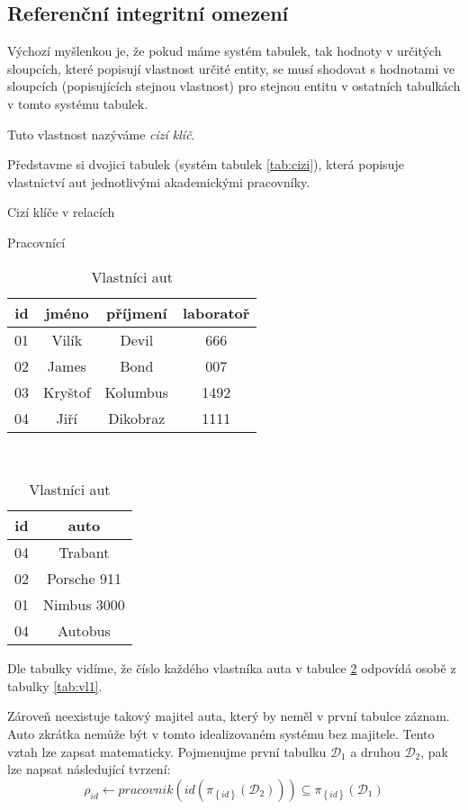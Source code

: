 \subsection{Referenční integritní omezení}
Výchozí myšlenkou je, že pokud máme systém tabulek, tak hodnoty v určitých sloupcích, které popisují vlastnost určité entity, se musí shodovat s hodnotami ve sloupcích (popisujících stejnou vlastnost) pro stejnou entitu v ostatních tabulkách v tomto systému tabulek.

Tuto vlastnost nazýváme \textit{cizí klíč}.

\begin{upexample}\label{ex:cizi}
Představme si dvojici tabulek (systém tabulek \ref{tab:cizi}), která popisuje vlastnictví aut jednotlivými akademickými pracovníky.
\begin{table}
\caption{Cizí klíče v relacích}\label{tab:cizi}
\begin{subtable}[t]{0.6\textwidth}
\centering
\caption{Pracovnící}\label{tab:vl1}
\begin{tabular}{c || c c c}
id & jméno & příjmení & laboratoř \\
\hline
\cellcolor{red}01 & Vilík & Devil & 666 \\
\cellcolor{yellow}02 & James & Bond & 007 \\
03 & Kryštof & Kolumbus & 1492 \\
\cellcolor{green}04 & Jiří & Dikobraz & 1111
\end{tabular}
\end{subtable}
~
\begin{subtable}[t]{0.38\textwidth}
\centering
\caption{Vlastníci aut}\label{tab:vl2}
\begin{tabular}{c || c}
id & auto \\
\hline
\cellcolor{green}04 & Trabant \\
\cellcolor{yellow}02 & Porsche 911 \\
\cellcolor{red}01 & Nimbus 3000 \\
\cellcolor{green}04 & Autobus
\end{tabular}
\end{subtable}
\end{table}
Dle tabulky vidíme, že číslo každého vlastníka auta v tabulce \ref{tab:vl2} odpovídá osobě z tabulky \ref{tab:vl1}.

Zároveň neexistuje takový majitel auta, který by neměl v první tabulce záznam. Auto zkrátka nemůže být v tomto idealizovaném systému bez majitele. Tento vztah lze zapsat matematicky. Pojmenujme první tabulku $\mathcal{D}_{1}$ a druhou $\mathcal{D}_{2}$, pak lze napsat následující tvrzení:
$$
\rho_{id} \leftarrow pracovnik( id(\pi_{\left\{ id \right\}} \left( \mathcal{D}_{2} \right) )) \subseteq \pi_{\left\{ id \right\}} \left( \mathcal{D}_{1} \right)
$$
\end{upexample}


